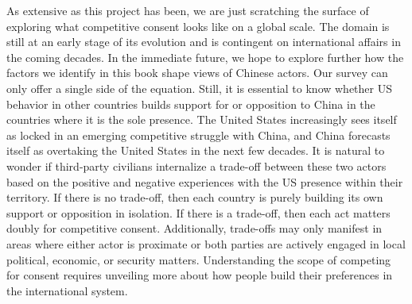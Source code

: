 
As extensive as this project has been, we are just scratching the surface of exploring what competitive consent looks like on a global scale. The domain is still at an early stage of its evolution and is contingent on international affairs in the coming decades. In the immediate future, we hope to explore further how the factors we identify in this book shape views of Chinese actors. Our survey can only offer a single side of the equation. Still, it is essential to know whether US behavior in other countries builds support for or opposition to China in the countries where it is the sole presence. The United States increasingly sees itself as locked in an emerging competitive struggle with China, and China forecasts itself as overtaking the United States in the next few decades.\cite{Doshi2021} It is natural to wonder if third-party civilians internalize a trade-off between these two actors based on the positive and negative experiences with the US presence within their territory. If there is no trade-off, then each country is purely building its own support or opposition in isolation. If there is a trade-off, then each act matters doubly for competitive consent. Additionally, trade-offs may only manifest in areas where either actor is proximate or both parties are actively engaged in local political, economic, or security matters. Understanding the scope of competing for consent requires unveiling more about how people build their preferences in the international system.

